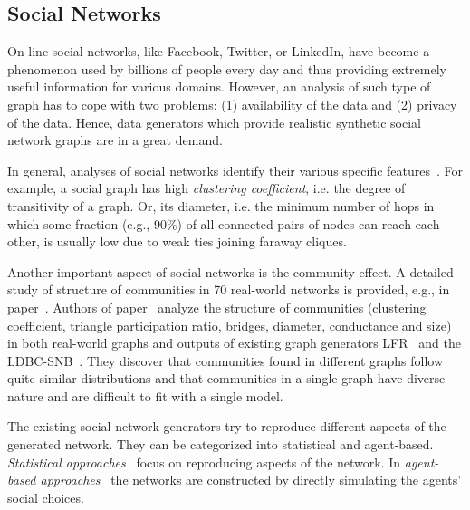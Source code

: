 \subsection{Social Networks}
\label{sec:generators_socialnetworks}

On-line social networks, like Facebook, Twitter, or LinkedIn, have become a
phenomenon used by billions of people every day and thus providing extremely
useful information for various domains. However, an analysis of such type of
graph has to cope with two problems: (1) availability of the data and (2)
privacy of the data. Hence, data generators which provide realistic synthetic
social network graphs are in a great demand. 

In general, analyses of social networks identify their various specific
features~\cite{Chakrabarti:2006:GML:1132952.1132954}. For example, a social
graph has high \emph{clustering coefficient}, i.e. the degree of transitivity of
a graph. Or, its diameter, i.e. the minimum number of hops in which some
fraction (e.g., 90\%) of all connected pairs of nodes can reach each other, is
usually low due to weak ties joining faraway cliques. 

Another important aspect
of social networks is the community effect. A detailed study of structure of
communities in 70 real-world networks is provided, e.g., in
paper~\cite{Leskovec:2008:SPC:1367497.1367591}. Authors of
paper~\cite{Prat-Perez:2014:CSS:2621934.2621942} analyze the structure of
communities (clustering coefficient, triangle participation ratio, bridges,
diameter, conductance and size) in both real-world graphs and outputs of existing graph
generators LFR~\cite{PhysRevE.78.046110} and the
LDBC-SNB~\cite{Erling:2015:LSN:2723372.2742786}. They discover that communities found in different graphs follow quite similar distributions and that communities in a single graph have diverse nature and are difficult to fit with a single model.

The existing social network generators try to reproduce different aspects of the
generated network. They can be categorized into statistical and agent-based.
\emph{Statistical
approaches}~\cite{PhysRevE.78.046110,Yao2011,Armstrong:2013:LDB:2463676.2465296,Pham2013,Sukthankar-SocialInfo2014,Erling:2015:LSN:2723372.2742786,Nettleton2016}
focus on reproducing aspects of the network. In \emph{agent-based
approaches}~\cite{Barrett:2009:GAL:1995456.1995598,Bernstein:2013:SAS:2499604.2499609}
the networks are constructed by directly simulating the agents' social choices.

